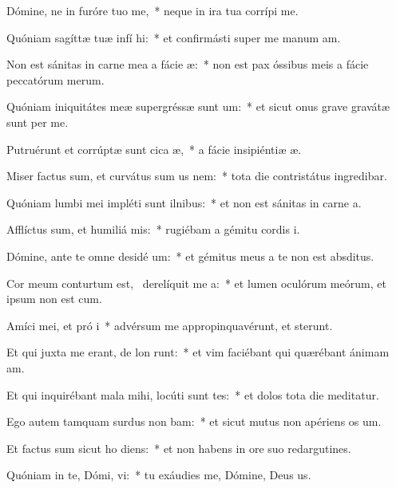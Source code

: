 \item Dómine, ne in furóre tuo  me,~* neque in ira tua corrípi me.
\item Quóniam sagíttæ tuæ infí  hi:~* et confirmásti super me manum am.
\item Non est sánitas in carne mea a fácie  æ:~* non est pax óssibus meis a fácie peccatórum merum.
\item Quóniam iniquitátes meæ supergréssæ sunt  um:~* et sicut onus grave gravátæ sunt per me.
\item Putruérunt et corrúptæ sunt cica æ,~* a fácie insipiéntiæ æ.
\item Miser factus sum, et curvátus sum us  nem:~* tota die contristátus ingredibar.
\item Quóniam lumbi mei impléti sunt ilnibus:~* et non est sánitas in carne a.
\item Afflíctus sum, et humiliá  mis:~* rugiébam a gémitu cordis i.
\item Dómine, ante te omne desidé um:~* et gémitus meus a te non est absditus.
\item Cor meum conturtum est,~\pscross{} derelíquit me  a:~* et lumen oculórum meórum, et ipsum non est cum.
\item Amíci mei, et pró i~* advérsum me appropinquavérunt, et sterunt.
\item Et qui juxta me erant, de lon runt:~* et vim faciébant qui quærébant ánimam am.
\item Et qui inquirébant mala mihi, locúti sunt tes:~* et dolos tota die meditatur.
\item Ego autem tamquam surdus non bam:~* et sicut mutus non apériens os um.
\item Et factus sum sicut ho  diens:~* et non habens in ore suo redargutines.
\item Quóniam in te, Dómi, vi:~* tu exáudies me, Dómine, Deus us.
